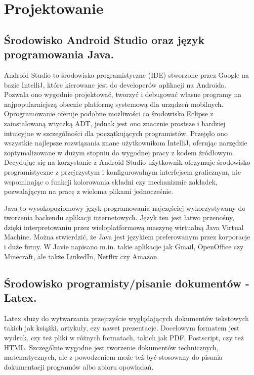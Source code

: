 \newpage
\section{Projektowanie}		%

\subsection{Środowisko Android Studio oraz język programowania Java.}
\hspace{0.60cm}Android Studio to środowisko programistyczne (IDE) stworzone przez Google na bazie IntelliJ, które kierowane jest do developerów aplikacji na Androida. Pozwala ono wygodnie projektować, tworzyć i debugować własne programy na najpopularniejszą obecnie platformę systemową dla urządzeń mobilnych. Oprogramowanie oferuje podobne możliwości co środowisko Eclipse z zainstalowaną wtyczką ADT, jednak jest ono znacznie prostsze i bardziej intuicyjne w szczególności dla początkujących programistów. Przejęło ono wszystkie najlepsze rozwiązania znane użytkownikom IntelliJ, oferując narzędzie zoptymalizowane w dużym stopniu do wygodnej pracy z kodem źródłowym. Decydując się na korzystanie z Android Studio użytkownik otrzymuje środowisko programistyczne z przejrzystym i konfigurowalnym interfejsem graficznym, nie wspominając o funkcji kolorowania składni czy mechanizmie zakładek, pozwalającym na pracę z wieloma plikami jednocześnie. \newline

Java to wysokopoziomowy język programowania najczęściej wykorzystywany do tworzenia backendu aplikacji internetowych. Język ten jest łatwo przenośny, dzięki interpretowaniu przez wieloplatformową maszynę wirtualną Java Virtual Machine. Można stwierdzić, że Java jest językiem preferowanym przez korporacje i duże firmy. W Javie napisano m.in. takie aplikacje jak Gmail, OpenOffice czy Minecraft, ale także LinkedIn, Netflix czy Amazon.

\newpage


\subsection{Środowisko programisty/pisanie dokumentów - Latex.}
\hspace{0.60cm}Latex służy do wytwarzania przejrzyście wyglądających dokumentów tekstowych takich jak książki, artykuły, czy nawet prezentacje. Docelowym formatem jest wydruk, czy też pliki w różnych formatach, takich jak PDF, Postscript, czy też HTML. Szczególnie wygodne jest tworzenie dokumentów technicznych, matematycznych, ale z powodzeniem może też być stosowany do pisania dokumentacji programów albo zbioru opowiadań.\newline

